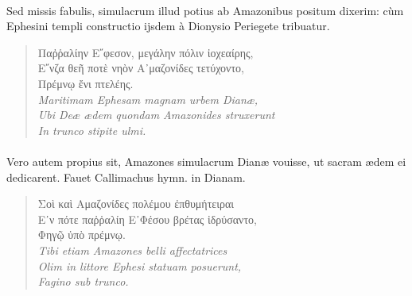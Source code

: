\documentclass[a4paper, 11pt, oneside, polutonikogreek, latin]{article}
\begin{document}
\paragraph{}
Sed missis fabulis, simulacrum illud potius ab Amazonibus positum dixerim: cùm Ephesini templi constructio ijsdem à Dionysio Periegete tribuatur.
\begin{quote}
\hspace*{0mm}Παῤῥαλίην Ε῎φεσον, μεγάλην πόλιν ἰοχεαίρης,\\
\hspace*{0mm}Ε῎νζα θεῆ ποτὲ νηὸν Α᾽μαζονίδες τετύχοντο,\\
\hspace*{0mm}Πρέμνῳ ἔνι πτελέης.\\

\hspace*{0mm}\emph{Maritimam Ephesam magnam urbem Dianæ,}\\
\hspace*{0mm}\emph{Ubi Deæ ædem quondam Amazonides struxerunt}\\
\hspace*{0mm}\emph{In trunco stipite ulmi.}\\
\end{quote}
\paragraph{}
Vero autem propius sit, Amazones simulacrum Dianæ vouisse, ut sacram ædem ei dedicarent. Fauet Callimachus hymn. in Dianam.
\begin{quote}
\hspace*{0mm}Σοὶ καὶ Αμαζονίδες πολέμου ἐπθυμήτειραι\\
\hspace*{0mm}Ε᾽ν πότε παῤῥαλίη Ε᾽Φέσου βρέτας ἱδρύσαντο,\\
\hspace*{0mm}Φηγῷ ὑπὸ πρέμνῳ.\\

\hspace*{0mm}\emph{Tibi etiam Amazones belli affectatrices}\\
\hspace*{0mm}\emph{Olim in littore Ephesi statuam posuerunt,}\\
\hspace*{0mm}\emph{Fagino sub trunco.}\\
\end{quote}
\end{document}
